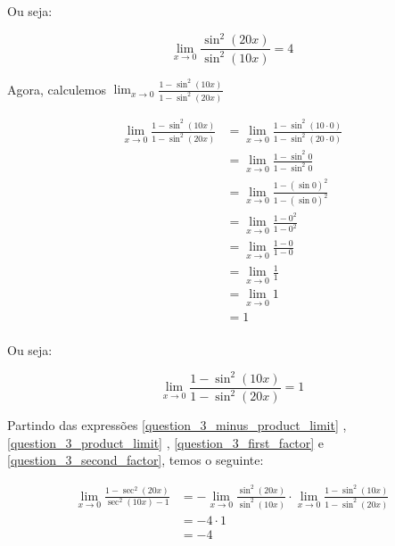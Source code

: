 \documentclass{article}
\begin{document}
Ou seja:

\begin{equation} \label{question_3_first_factor}
    \lim_{x \to 0} \frac{ \sin^2 (20x)}{\sin^2 (10x)} =  4
\end{equation}

Agora, calculemos \(\lim_{x \to 0}  \frac{1 - \sin^2 (10x)}{1 - \sin^2 (20x)}\)

\begin{align*}
    \lim_{x \to 0}  \frac{1 - \sin^2 (10x)}{1 - \sin^2 (20x)}
     & =  \lim_{x \to 0}  \frac{1 - \sin^2 (10 \cdot 0)}{1 - \sin^2 (20 \cdot 0)} \\
     & =  \lim_{x \to 0}  \frac{1 - \sin^2 0}{1 - \sin^2 0}                       \\
     & =  \lim_{x \to 0}  \frac{1 - (\sin 0)^2}{1 - (\sin 0)^2}                   \\
     & =  \lim_{x \to 0}  \frac{1 - 0^2}{1 - 0^2}                                 \\
     & =  \lim_{x \to 0}  \frac{1 - 0}{1 - 0}                                     \\
     & =  \lim_{x \to 0}  \frac{1}{1}                                             \\
     & =  \lim_{x \to 0}  1                                                       \\
     & =  1                                                                       \\
\end{align*}

Ou seja:

\begin{equation} \label{question_3_second_factor}
    \lim_{x \to 0}  \frac{1 - \sin^2 (10x)}{1 - \sin^2 (20x)} =  1
\end{equation}

Partindo das expressões \ref{question_3_minus_product_limit}
, \ref{question_3_product_limit}
, \ref{question_3_first_factor}
e \ref{question_3_second_factor}, temos o seguinte:

\begin{align*}
    \lim_{x \to 0} \frac{1 - \sec^2(20x) }{\sec^2(10x) - 1}
     & = - \lim_{x \to 0} \frac{ \sin^2 (20x)}{\sin^2 (10x)}  \cdot \lim_{x \to 0}  \frac{1 - \sin^2 (10x)}{1 - \sin^2 (20x)} \\
     & = - 4  \cdot 1                                                                                                         \\
     & = - 4                                                                                                                  \\
\end{align*}
\end{document}
